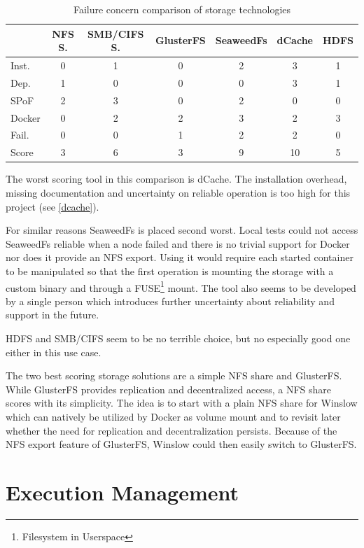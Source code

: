 \begin{table}[H]
	\begin{tabular}{|l|c|c|c|c|c|c|}\hline
				& NFS S.& SMB/CIFS S.& GlusterFS & SeaweedFs	& dCache 	& HDFS \\
		\hline
		Inst. 	& 0 	& 1 		& 0 		& 2 		& 3			& 1 \\
		Dep. 	& 1 	& 0			& 0 		& 0 		& 3 		& 1 \\
		SPoF 	& 2		& 3			& 0			& 2 		& 0			& 0 \\
		Docker 	& 0 	& 2 		& 2 		& 3 		& 2 		& 3 \\
		Fail.	& 0		& 0			& 1			& 2			& 2			& 0 \\
		\hline \hline
		Score 	& 3		& 6			& 3			& 9			& 10		& 5 \\ \hline
	\end{tabular}
	\caption{Failure concern comparison of storage technologies}
	\label{comparision:storage}
\end{table}

The worst scoring tool in this comparison is dCache.
The installation overhead, missing documentation and uncertainty on reliable operation is too high for this project (see \autoref{dcache}).

For similar reasons SeaweedFs is placed second worst.
Local tests could not access SeaweedFs reliable when a node failed and there is no trivial support for Docker nor does it provide an NFS export.
Using it would require each started container to be manipulated so that the first operation is mounting the storage with a custom binary and through a FUSE\footnote{Filesystem in Userspace} mount.
The tool also seems to be developed by a single person which introduces further uncertainty about reliability and support in the future.

HDFS and SMB/CIFS seem to be no terrible choice, but no especially good one either in this use case.

The two best scoring storage solutions are a simple NFS share and GlusterFS.
While GlusterFS provides replication and decentralized access, a NFS share scores with its simplicity.
The idea is to start with a plain NFS share for Winslow which can natively be utilized by Docker as volume mount and to revisit later whether the need for replication and decentralization persists.
Because of the NFS export feature of GlusterFS, Winslow could then easily switch to GlusterFS.



\section{Execution Management}

